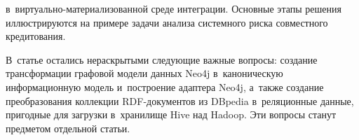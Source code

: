 \begin{multicols}{2}

\noindent
 в~вир\-ту\-аль\-но-ма\-те\-риализованной 
среде интеграции. Основные этапы решения иллюстрируются на примере 
задачи анализа системного риска совместного кредитования. 

В~статье остались 
нераскрытыми следующие важные вопросы: создание трансформации графовой 
модели данных Neo4j в~каноническую информационную модель и~построение 
адап\-те\-ра Neo4j, а~также создание преобразования коллекции  
RDF-до\-ку\-мен\-тов из DBpedia в~реляционные данные, пригодные для 
загрузки в~хранилище Hive над Hadoop. Эти вопросы станут предметом 
отдельной статьи.

\vspace*{-6pt}


{\small\frenchspacing
 {%
 \begin{thebibliography}{99}
 
 \vspace*{-2pt}
 

\end{thebibliography}}}
\end{multicols}
